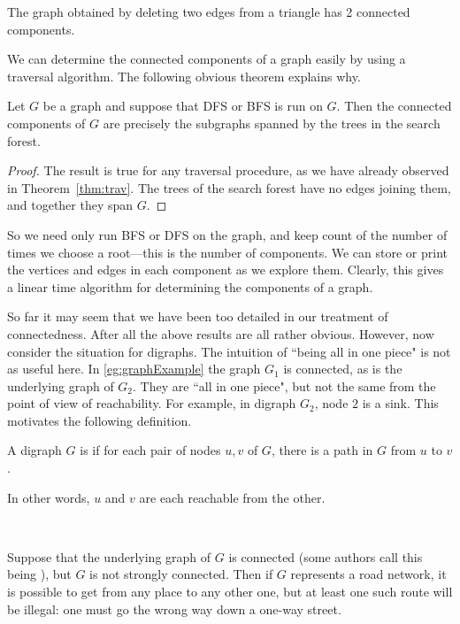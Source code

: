 \begin{Example}
\label{eg:components}
The graph obtained by deleting two edges from a triangle has 2 connected 
components.
\end{Example}

We can determine the connected components of a graph easily by using a
traversal algorithm. The following obvious theorem explains why.

\begin{Theorem}
\label{thm:trav-comps}
Let $G$ be a graph and suppose that DFS or BFS is run on $G$. Then the
connected components of $G$ are precisely the subgraphs spanned by the
trees in the search forest. 
\end{Theorem}

\begin{proof}
The result is true for any traversal procedure, as we have already observed in 
Theorem~\ref{thm:trav}. The trees of the search forest have no edges joining 
them, and together they span $G$.
\end{proof}

So we need only run BFS or DFS on the graph, and keep count
of the number of times we choose a root---this is the number of
components. We can store or print the vertices and edges in each
component as we explore them. Clearly, this gives a linear time algorithm
for determining the components of a graph.

So far it may seem that we have been too detailed in our treatment of 
connectedness. After all the above results are all rather obvious.
However, now consider the situation for digraphs. The intuition of ``being all 
in one piece" is not as useful here. In
\cref{eg:graphExample} the graph $G_1$ is connected, as is the
underlying graph of $G_2$. They are ``all in one piece", but not the
same from the point of view of reachability. For example, in digraph
$G_2$, node $2$ is a sink. This motivates the following definition.

\begin{Definition}
A digraph $G$ is  if for each pair of nodes $u, v$ 
of $G$, there is a path in $G$ from $u$ to $v$.
\end{Definition}

\begin{note}
In other words, $u$ and $v$ are each reachable from the other.

\

Suppose that the underlying graph of $G$ is connected (some authors call
this being ), but $G$ is not strongly
connected. Then if $G$ represents a road network, it is possible to get
from any place to any other one, but at least one such route will be
illegal: one must go the wrong way down a one-way street. 
\end{note}

